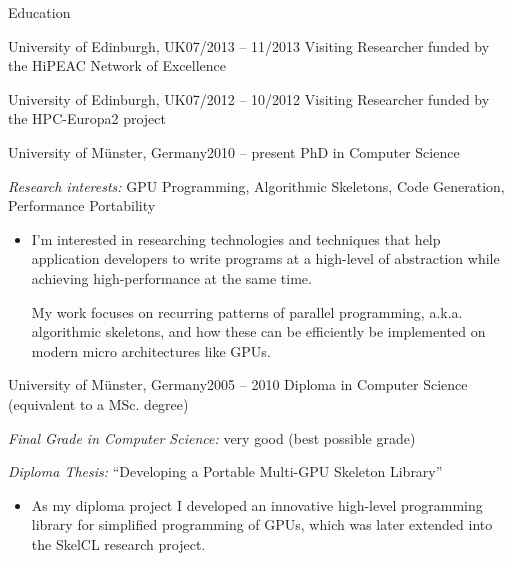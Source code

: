 \documentclass[letterpaper]{resume} %
\begin{document}
\begin{rSection}{Education}

\begin{rSubsection}{University of Edinburgh\normalfont{}, UK}{07/2013 -- 11/2013}%
                    {Visiting Researcher funded by the HiPEAC Network of Excellence}{}
  \item \vspace{-1.5em}
\end{rSubsection}

\begin{rSubsection}{University of Edinburgh\normalfont{}, UK}{07/2012 -- 10/2012}%
                   {Visiting Researcher funded by the HPC-Europa2 project}{}
\item \vspace{-1.5em}
\end{rSubsection}

\begin{rSubsection}{University of M\"unster\normalfont{}, Germany}{2010 -- present}%
                   {PhD in Computer Science}{}
  \item \emph{Research interests:} GPU Programming, Algorithmic Skeletons,
      Code Generation, Performance Portability
    \begin{itemize}
      \item[] I'm interested in researching technologies and techniques that help
        application developers to write programs at a high-level of abstraction
        while achieving high-performance at the same time.
        
        My work focuses on recurring patterns of parallel programming,
        a.k.a. algorithmic skeletons,
        and how these can be efficiently be implemented on modern micro
        architectures like GPUs.
        
    \end{itemize}
\end{rSubsection}

\begin{rSubsection}{University of M\"unster\normalfont{}, Germany}{2005 -- 2010}%
                   {Diploma in Computer Science (equivalent to a MSc. degree)}{}
  \item \emph{Final Grade in Computer Science:} very good (best possible grade)\\[-1em]
  \item \emph{Diploma Thesis:} ``Developing a Portable Multi-GPU Skeleton Library''
    \vspace{-.25em}
    \begin{itemize}
      \item[] As my diploma project I developed an innovative high-level
        programming library for simplified programming of GPUs, which was later
        extended into the SkelCL research project.



\end{itemize}
\end{rSubsection}
\end{rSection}
\end{document}
